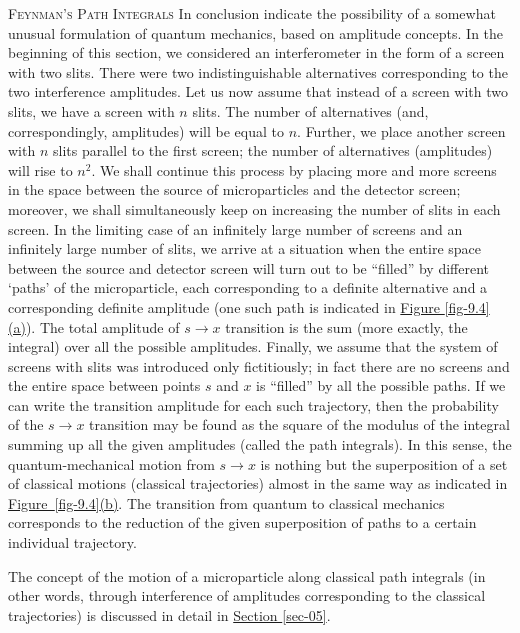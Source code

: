 \documentclass[a4paper,sfsidenotes,colorlinks=true]{tufte-book}
\numberwithin{equation}{section}
\numberwithin{figure}{section}
\begin{document}
\textsc{Feynman's Path Integrals} \textsf{\small In conclusion
  indicate the possibility of a somewhat unusual formulation of
  quantum mechanics, based on amplitude concepts. In the beginning of
  this section, we considered an interferometer in the form of a
  screen with two slits. There were two indistinguishable alternatives
  corresponding to the two interference amplitudes. Let us now assume
  that instead of a screen with two slits, we have a screen with $n$
  slits. The number of alternatives (and, correspondingly, amplitudes)
  will be equal to $n$. Further, we place another screen with $n$
  slits parallel to the first screen; the number of alternatives
  (amplitudes) will rise to $n^{2}$. We shall continue this process by
  placing more and more screens in the space between the source of
  microparticles and the detector screen; moreover, we shall
  simultaneously keep on increasing the number of slits in each
  screen. In the limiting case of an infinitely large number of
  screens and an infinitely large number of slits, we arrive at a
  situation when the entire space between the source and detector
  screen will turn out to be ``filled'' by different `paths' of the
  microparticle, each corresponding to a definite alternative and a
  corresponding definite amplitude (one such path is indicated in
  \hyperref[fig-9.4]{Figure \ref{fig-9.4}(a)}). The total amplitude of
  $s \to x$ transition is the sum (more exactly, the integral) over
  all the possible amplitudes. Finally, we assume that the system of
  screens with slits was introduced only fictitiously; in fact there
  are no screens and the entire space between points $s$ and $x$ is
  ``filled'' by all the possible paths. If we can write the transition
  amplitude for each such trajectory, then the probability of the $s
  \to x$ transition may be found as the square of the modulus of the
  integral summing up all the given amplitudes (called the path
  integrals). In this sense, the quantum-mechanical motion from $s \to
  x$ is nothing but the superposition of a set of classical motions
  (classical trajectories) almost in the same way as indicated in
  \hyperref[fig-9.4]{Figure~\ref{fig-9.4}(b)}. The transition from
  quantum to classical mechanics corresponds to the reduction of the
  given superposition of paths to a certain individual trajectory. }

  \textsf{\small The concept of the motion of a microparticle along classical path
  integrals (in other words, through interference of amplitudes
  corresponding to the classical trajectories) is discussed in detail
  in \hyperref[sec-05]{Section \ref{sec-05}}.}
\end{document}
